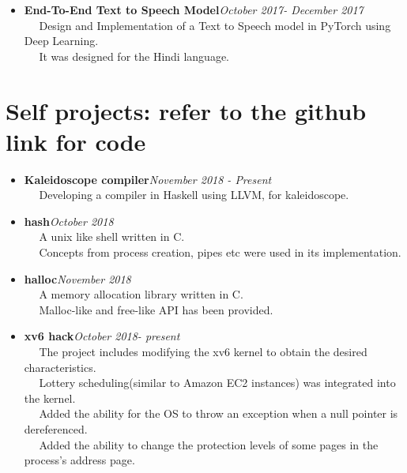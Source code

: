 \documentclass[margin, centered]{res}
\begin{document}
\begin{resume}
\begin{itemize}
\item \textbf{End-To-End Text to Speech Model}\hfill\textit{October 2017- December 2017}\\
~\textbullet~ Design and Implementation of a Text to Speech model in PyTorch using Deep Learning.\\
~\textbullet~ It was designed for the Hindi language.
\end{itemize}

\section{\textbf{Self projects: refer to the github link for code}}
\begin{itemize}
\item \textbf{Kaleidoscope compiler}\hfill\textit{November 2018 - Present}\\
~\textbullet~ Developing a compiler in Haskell using LLVM, for kaleidoscope.\\
\end{itemize}

\begin{itemize}
\item \textbf{hash}\hfill\textit{October 2018}\\
~\textbullet~ A unix like shell written in C.\\
~\textbullet~ Concepts from process creation, pipes etc were used in its implementation.\\
\end{itemize}

\begin{itemize}
\item \textbf{halloc}\hfill\textit{November 2018}\\
~\textbullet~ A memory allocation library written in C.\\
~\textbullet~ Malloc-like and free-like API has been provided.\\
\end{itemize}

\begin{itemize}
\item \textbf{xv6 hack}\hfill\textit{October 2018- present}\\
~\textbullet~ The project includes modifying the xv6 kernel to obtain the desired characteristics.\\
~\textbullet~ Lottery scheduling(similar to Amazon EC2 instances) was integrated into the kernel.\\
~\textbullet~ Added the ability for the OS to throw an exception when a null pointer is dereferenced.\\
~\textbullet~ Added the ability to change the protection levels of some pages in the process's address page.\\
\end{itemize}


\end{resume}
\end{document}
